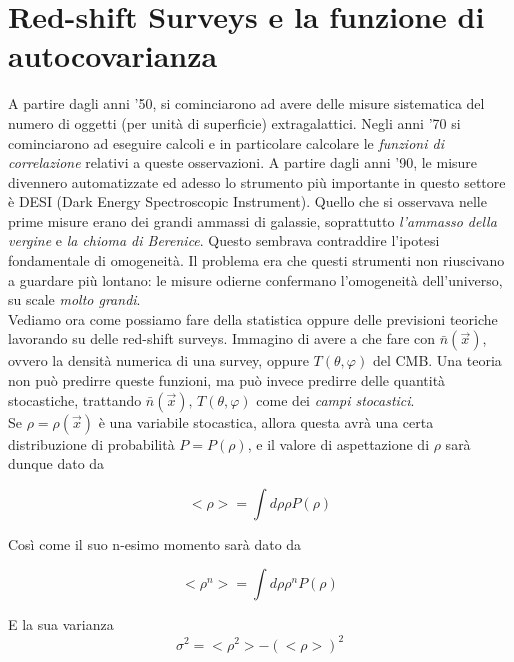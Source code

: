 \documentclass{report}
\begin{document}
\section{Red-shift Surveys e la funzione di autocovarianza}

A partire dagli anni '50, si cominciarono ad avere delle misure sistematica del numero di oggetti (per unità di superficie) extragalattici. Negli anni '70 si cominciarono ad eseguire calcoli e in particolare calcolare le \emph{funzioni di correlazione} relativi a queste osservazioni. A partire dagli anni '90, le misure divennero automatizzate ed adesso lo strumento più importante in questo settore è DESI (Dark Energy Spectroscopic Instrument). Quello che si osservava nelle prime misure erano dei grandi ammassi di galassie, soprattutto \emph{l'ammasso della vergine} e \emph{la chioma di Berenice}. Questo sembrava contraddire l'ipotesi fondamentale di omogeneità. Il problema era che questi strumenti non riuscivano a guardare più lontano: le misure odierne confermano l'omogeneità dell'universo, su scale \emph{molto grandi}. \\

Vediamo ora come possiamo fare della statistica oppure delle previsioni teoriche lavorando su delle  red-shift surveys. Immagino di avere a che fare con $\bar{n}(\vec{x})$, ovvero la densità numerica di una survey, oppure $T(\theta, \varphi)$ del CMB. Una teoria non può predirre queste funzioni, ma può invece predirre delle quantità stocastiche, trattando $\bar{n}(\vec{x}), \, T(\theta, \varphi)$ come dei \emph{campi stocastici}. \\

Se $\rho = \rho (\vec{x})$ è una variabile stocastica, allora questa avrà una certa distribuzione di probabilità $P= P(\rho)$, e il valore di aspettazione di $\rho$ sarà dunque dato da

\begin{equation}
    <\rho> = \int d\rho \rho P(\rho )
\end{equation}

Così come il suo n-esimo momento sarà dato da 

\begin{equation}
    <\rho^n> = \int d\rho \rho^n P(\rho )
\end{equation}

E la sua varianza 
\begin{equation}
    \sigma^2 = <\rho^2> - (<\rho>)^2
\end{equation}
\end{document}
